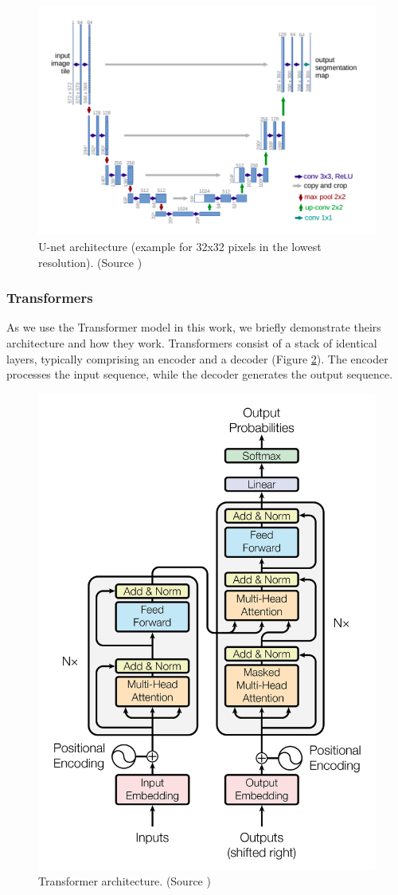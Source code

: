 \begin{figure}
  \centering
  \includegraphics[width=\linewidth]{text/chapter_03/imgs/unet}
  \caption{U-net architecture (example for 32x32 pixels in the lowest resolution). (Source \cite{ronneberger2015unet})}
  \label{fig:unet_architecture}
\end{figure}

\subsubsection{Transformers}
As we use the Transformer model in this work, we briefly demonstrate theirs architecture and how they work.
Transformers consist of a stack of identical layers, typically comprising an encoder and a decoder (Figure \ref{fig:transformer_architecture}). The
encoder
processes the input sequence, while the decoder generates the output sequence.


\begin{figure}
  \centering
  \includegraphics[width=0.5\linewidth]{text/chapter_03/imgs/transformers}
  \caption{Transformer architecture. (Source \cite{vaswani2023attention})}
  \label{fig:transformer_architecture}
\end{figure}

